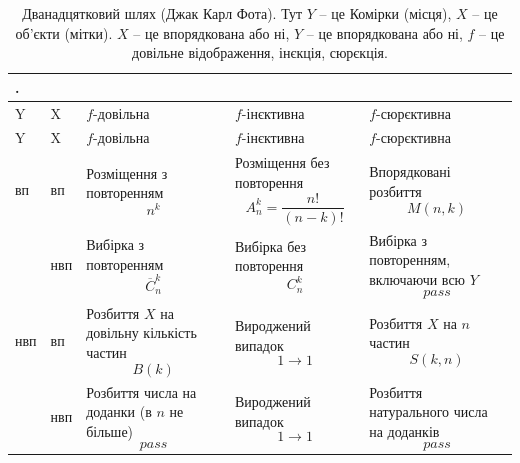 \begin{center}
    \raggedright
    \begin{longtable}{|P{0.8cm}|P{0.8cm}|P{3cm}|P{4.5cm}|P{4.5cm}|}
        \caption{Дванадцятковий шлях (Джак Карл Фота). Тут $Y$ -- це Комірки (місця), $X$ -- це об'єкти (мітки). $X$ -- це впорядкована або ні, $Y$ -- це впорядкована або ні, $f$ -- це довільне відображення, інєкція, сюрєкція.}\label{tab:twelwe_path}.\\
        
        \hline Y & X & $f$-довільна & $f$-інєктивна & $f$-сюрєктивна \\
        \endfirsthead
        
        \hline Y & X & $f$-довільна & $f$-інєктивна & $f$-сюрєктивна \\
        
        \endhead
        
        \hline
        \endfoot
        
        \hline \hline
        \endlastfoot
        
        \hline вп
            & вп
                & Розміщення з повторенням $$n^k$$
                & Розміщення без повторення $$A_n^k = \dfrac{n!}{(n-k)!}$$
                & Впорядковані розбиття $$M(n,k)$$  \\
            & нвп
                & Вибірка з повторенням $$\overline{C}_n^k$$
                & Вибірка без повторення $$C_n^k$$
                & Вибірка з повторенням, включаючи всю $Y$ $$pass$$  \\

        \hline нвп
            & вп
                & Розбиття $X$ на довільну кількість частин  $$B(k)$$
                & Вироджений випадок $$1 \rightarrow 1$$
                & Розбиття $X$ на $n$ частин $$S(k, n)$$  \\
            & нвп
                & Розбиття числа на доданки (в $n$ не більше) $$pass$$
                & Вироджений випадок $$1 \rightarrow 1$$
                & Розбиття натурального числа на  доданків $$pass$$  \\
        \hline
    \end{longtable}
\end{center}

